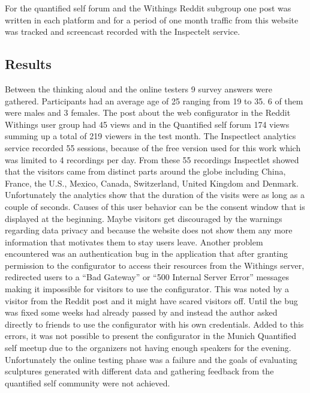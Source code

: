 \documentclass[../medieninformatik-arbeit.tex]{subfiles}
\begin{document}
For the quantified self forum and the Withings Reddit subgroup one post was written in each platform and for a period of one month traffic from this website was tracked and screencast recorded with the Inspectelt service. 

\subsection{Results}
Between the thinking aloud and the online testers 9 survey answers were gathered. Participants had an average age of 25 ranging from 19 to 35. 6 of them were males and 3 females. The post about the web configurator in the Reddit Withings user group had 45 views  and in the Quantified self forum 174 views summing up a total of 219 viewers in the test month. The  Inspectlect analytics service recorded 55 sessions, because of the free version used for this work which was limited to 4 recordings per day. From these 55 recordings Inspectlet showed that the visitors came from distinct parts around the globe including China, France, the U.S., Mexico, Canada, Switzerland, United Kingdom and Denmark. Unfortunately the analytics show that the duration of the visits were as long as a couple of seconds. Causes of this user behavior can be the consent window that is displayed at the beginning. Maybe visitors get discouraged by the warnings regarding data privacy and because the website does not show them any more information that motivates them to stay users leave. Another problem encountered was an authentication bug in the application that after granting permission to the configurator to access their resources from the Withings server, redirected users to a ``Bad Gateway'' or ``500 Internal Server Error'' messages making it impossible for visitors to use the configurator. This was noted by a visitor from the Reddit post and it might have scared visitors off. Until the bug was fixed some weeks had already passed by and instead the author asked directly to friends to use the configurator with his own credentials. Added to this errors, it was not possible to present the configurator in the Munich Quantified self meetup due to the organizers not having enough speakers for the evening. Unfortunately the online testing phase was a failure and the goals of evaluating sculptures generated with different data and gathering feedback from the quantified self community were not achieved. 
\end{document}
